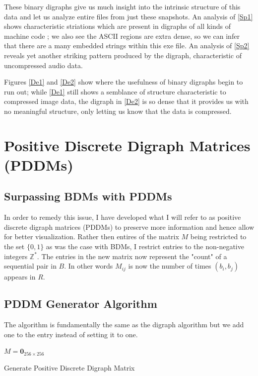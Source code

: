 \documentclass[12pt,a4paper]{article}
\begin{document}
These binary digraphs give us much insight into the intrinsic structure of this data and let us analyze entire files from just these snapshots. An analysis of \ref{Sp1} shows characteristic striations which are present in digraphs of all kinds of machine code \cite{future}; we also see the ASCII regions are extra dense, so we can infer that there are a many embedded strings within this exe file. An analysis of \ref{Sp2} reveals yet another striking pattern produced by the digraph, characteristic of uncompressed audio data. 

Figures \ref{De1} and \ref{De2} show where the usefulness of binary digraphs begin to run out; while \ref{De1} still shows a semblance of structure characteristic to compressed image data, the digraph in \ref{De2} is so dense that it provides us with no meaningful structure, only letting us know that the data is compressed. 

\section{Positive Discrete Digraph Matrices (PDDMs)}
\subsection{Surpassing BDMs with PDDMs}
In order to remedy this issue, I have developed what I will refer to as positive discrete digraph matrices (PDDMs) to preserve more information and hence allow for better visualization. Rather then entires of the matrix $M$ being restricted to the set $\{0, 1\}$ as was the case with BDMs, I restrict entries to the non-negative integers $\mathbb{Z}^{\ast}$. The entries in the new matrix now represent the "count" of a sequential pair in $B$. In other words $M_{ij}$ is now the number of times $(b_i, b_j)$ appears in $R$.
\subsection{PDDM Generator Algorithm}
The algorithm is fundamentally the same as the digraph algorithm  but we add one to the entry instead of setting it to one. 
\begin{algorithm}
\DontPrintSemicolon
{}
\BlankLine
$M = \textbf{0}_{256\times256}$\;
\caption{Generate Positive Discrete Digraph Matrix}
\end{algorithm}
\end{document}
